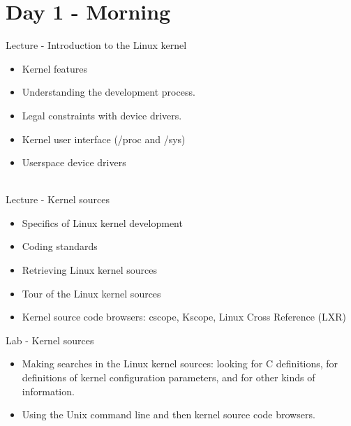 \documentclass[a4paper,12pt,obeyspaces,spaces,hyphens]{article}
\begin{document}
\section{Day 1 - Morning}

\feagendaonecolumn
{Lecture - Introduction to the Linux kernel}
{
  \begin{itemize}
  \item Kernel features
  \item Understanding the development process.
  \item Legal constraints with device drivers.
  \item Kernel user interface (/proc and /sys)
  \item Userspace device drivers
  \end{itemize}
}
\\
\feagendatwocolumn
{Lecture - Kernel sources}
{
  \begin{itemize}
  \item Specifics of Linux kernel development
  \item Coding standards
  \item Retrieving Linux kernel sources
  \item Tour of the Linux kernel sources
  \item Kernel source code browsers: cscope, Kscope, Linux Cross
    Reference (LXR)
  \end{itemize}
}
{Lab - Kernel sources}
{
  \begin{itemize}
  \item Making searches in the Linux kernel sources: looking for C
    definitions, for definitions of kernel configuration parameters,
    and for other kinds of information.
  \item Using the Unix command line and then kernel source code
    browsers.
 \end{itemize}
}
\end{document}
